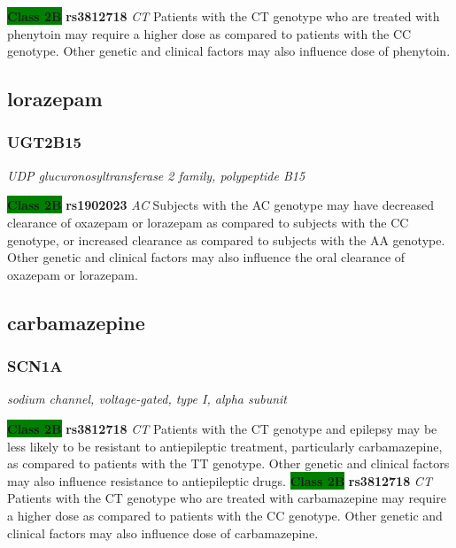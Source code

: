 \documentclass{report}
\begin{document}
\textbf{\colorbox{green} {Class 2B}} \textbf{ rs3812718 } \textit{ CT }
Patients with the CT genotype who are treated with phenytoin may require a higher dose as compared to patients with the CC genotype. Other genetic and clinical factors may also influence dose of phenytoin.\newline

\subsection{ lorazepam }\subsubsection{ UGT2B15 }
\textit{ UDP glucuronosyltransferase 2 family, polypeptide B15 } \newline





\textbf{\colorbox{green} {Class 2B}} \textbf{ rs1902023 } \textit{ AC }
Subjects with the AC genotype may have decreased clearance of oxazepam or lorazepam as compared to subjects with the CC genotype, or increased clearance as compared to subjects with the AA genotype. Other genetic and clinical factors may also influence the oral clearance of oxazepam or lorazepam.\newline

\subsection{ carbamazepine }\subsubsection{ SCN1A }
\textit{ sodium channel, voltage-gated, type I, alpha subunit } \newline





\textbf{\colorbox{green} {Class 2B}} \textbf{ rs3812718 } \textit{ CT }
Patients with the CT genotype and epilepsy may be less likely to be resistant to antiepileptic treatment, particularly carbamazepine, as compared to patients with the TT genotype. Other genetic and clinical factors may also influence resistance to antiepileptic drugs.\newline
\textbf{\colorbox{green} {Class 2B}} \textbf{ rs3812718 } \textit{ CT }
Patients with the CT genotype who are treated with carbamazepine may require a higher dose as compared to patients with the CC genotype. Other genetic and clinical factors may also influence dose of carbamazepine.\newline
\end{document}
